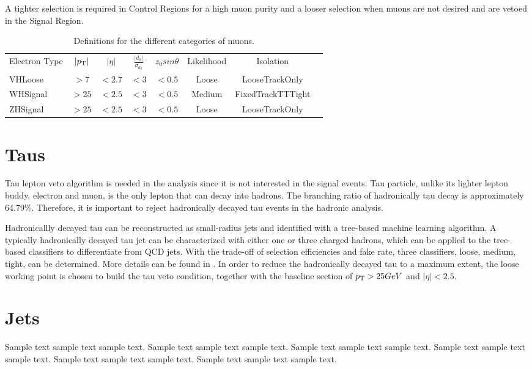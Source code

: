 A tighter selection is required in Control Regions for a high muon purity and a looser selection when muons are not desired and are vetoed in the Signal Region.
\begin{table}[tbh]
\centering
\begin{tabular}{|l|c|c|c|c|c|c|c}

\hline
Electron Type & $|p_{\mathrm{T}}|$ &$|\eta|$ & $\frac{|d_0|}{\sigma_{d_0}}$&$z_0 sin\theta$ & Likelihood &Isolation \\
VHLoose &$>7$&$<2.7$&$<3$&$<0.5$&Loose&LooseTrackOnly\\
WHSignal &$>25$&$<2.5$&$<3$&$<0.5$&Medium&FixedTrackTTTight\\
ZHSignal &$>25$&$<2.5$&$<3$&$<0.5$&Loose&LooseTrackOnly\\
\hline
\end{tabular}
\caption{Definitions for the different categories of muons.}
  \label{tab:mu}
\end{table}


\section{Taus}
\label{sec:taus}
\par Tau lepton veto algorithm is needed in the analysis since it is not interested in the signal events. Tau particle, unlike its lighter lepton buddy, electron and muon, is the only lepton that can decay into hadrons. The branching ratio of hadronically tau decay is approximately 64.79\%. Therefore, it is important to reject hadronically decayed tau events in the hadronic analysis.

\par Hadronicallly decayed tau can be reconstructed as small-radius jets and identified with a tree-based machine learning algorithm. A typically hadronically decayed tau jet can be characterized with either one or three charged hadrons, which can be applied to the tree-based classifiers to differentiate from QCD jets. With the trade-off of selection efficiencies and fake rate, three classifiers, loose, medium, tight, can be determined. More details can be found in \cite{ATL-PHYS-PUB-2015-045}. In order to reduce the hadronically decayed tau to a maximum extent, the loose working point is chosen to build the tau veto condition, together with the baseline section of $p_{\mathrm{T}} > 25 GeV$ and $|\eta| < 2.5$.

\section{Jets}
\label{sec:jets}
Sample text sample text sample text. Sample text sample text sample text.
Sample text sample text sample text. Sample text sample text sample text.
Sample text sample text sample text. Sample text sample text sample text.
